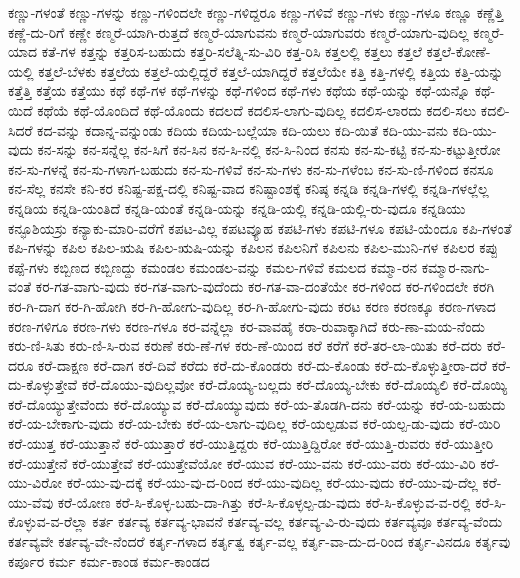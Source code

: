 {ಕಣ್ಣು-ಗಳಂತೆ
ಕಣ್ಣು-ಗಳನ್ನು
ಕಣ್ಣು-ಗಳಿಂದಲೇ
ಕಣ್ಣು-ಗಳಿದ್ದರೂ
ಕಣ್ಣು-ಗಳಿವೆ
ಕಣ್ಣು-ಗಳು
ಕಣ್ಣು-ಗಳೂ
ಕಣ್ಣೂ
ಕಣ್ಣೆತ್ತಿ
ಕಣ್ಣೆ-ದು-ರಿಗೆ
ಕಣ್ಣೇ
ಕಣ್ಮರೆ-ಯಾಗಿ-ರುತ್ತದೆ
ಕಣ್ಮರೆ-ಯಾಗುವನು
ಕಣ್ಮರೆ-ಯಾಗುವರು
ಕಣ್ಮರೆ-ಯಾಗು-ವುದಿಲ್ಲ
ಕಣ್ಮರೆ-ಯಾದ
ಕತೆ-ಗಳ
ಕತ್ತನ್ನು
ಕತ್ತರಿಸ-ಬಹುದು
ಕತ್ತರಿ-ಸಲೆತ್ನಿ-ಸು-ವಿರಿ
ಕತ್ತ-ರಿಸಿ
ಕತ್ತಲಲ್ಲಿ
ಕತ್ತಲು
ಕತ್ತಲೆ
ಕತ್ತಲೆ-ಕೋಣೆ-ಯಲ್ಲಿ
ಕತ್ತಲೆ-ಬೆಳಕು
ಕತ್ತಲೆಯ
ಕತ್ತಲೆ-ಯಲ್ಲಿದ್ದರೆ
ಕತ್ತಲೆ-ಯಾಗಿದ್ದರೆ
ಕತ್ತಲೆಯೇ
ಕತ್ತಿ
ಕತ್ತಿ-ಗಳಲ್ಲಿ
ಕತ್ತಿಯ
ಕತ್ತಿ-ಯನ್ನು
ಕತ್ತೆತ್ತಿ
ಕತ್ತೆಯ
ಕತ್ತೆಯು
ಕಥೆ
ಕಥೆ-ಗಳ
ಕಥೆ-ಗಳನ್ನು
ಕಥೆ-ಗಳಿಂದ
ಕಥೆ-ಗಳು
ಕಥೆಯ
ಕಥೆ-ಯನ್ನು
ಕಥೆ-ಯನ್ನೊ
ಕಥೆ-ಯಿದೆ
ಕಥೆಯೆ
ಕಥೆ-ಯೊಂದಿದೆ
ಕಥೆ-ಯೊಂದು
ಕದಲದೆ
ಕದಲಿಸ-ಲಾಗು-ವುದಿಲ್ಲ
ಕದಲಿಸ-ಲಾರದು
ಕದಲಿ-ಸಲು
ಕದಲಿ-ಸಿದರೆ
ಕದ-ವನ್ನು
ಕದಾನ್ನ-ವನ್ನುಂಡು
ಕದಿಯ
ಕದಿಯ-ಬಲ್ಲೆಯಾ
ಕದಿ-ಯಲು
ಕದಿ-ಯಿತೆ
ಕದಿ-ಯು-ವನು
ಕದಿ-ಯು-ವುದು
ಕನ-ಸನ್ನು
ಕನ-ಸನ್ನೆಲ್ಲ
ಕನ-ಸಿಗೆ
ಕನ-ಸಿನ
ಕನ-ಸಿ-ನಲ್ಲಿ
ಕನ-ಸಿ-ನಿಂದ
ಕನಸು
ಕನ-ಸು-ಕಟ್ಟಿ
ಕನ-ಸು-ಕಟ್ಟುತ್ತೀರೋ
ಕನ-ಸು-ಗಳನ್ನೆ
ಕನ-ಸು-ಗಳಾಗ-ಬಹುದು
ಕನ-ಸು-ಗಳಿವೆ
ಕನ-ಸು-ಗಳು
ಕನ-ಸು-ಗಳೆಂಬ
ಕನ-ಸು-ಣಿ-ಗಳಿಂದ
ಕನಸೂ
ಕನ-ಸೆಲ್ಲ
ಕನಸೇ
ಕನಿ-ಕರ
ಕನಿಷ್ಟ-ಪಕ್ಷ-ದಲ್ಲಿ
ಕನಿಷ್ಟ-ವಾದ
ಕನಿಷ್ಟಾಂಶಕ್ಕೆ
ಕನಿಷ್ಠ
ಕನ್ನಡಿ
ಕನ್ನಡಿ-ಗಳಲ್ಲಿ
ಕನ್ನಡಿ-ಗಳಲ್ಲೆಲ್ಲ
ಕನ್ನಡಿಯ
ಕನ್ನಡಿ-ಯಂತಿದೆ
ಕನ್ನಡಿ-ಯಂತೆ
ಕನ್ನಡಿ-ಯನ್ನು
ಕನ್ನಡಿ-ಯಲ್ಲಿ
ಕನ್ನಡಿ-ಯಲ್ಲಿ-ರು-ವುದೂ
ಕನ್ನಡಿಯು
ಕನ್ಫೂಶಿಯಸ್ರು
ಕನ್ಯಾಕು-ಮಾರಿ-ವರೆಗೆ
ಕಪಟ-ವಿಲ್ಲ
ಕಪಟವ್ಯೂಹ
ಕಪಟಿ-ಗಳು
ಕಪಟಿ-ಗಳೂ
ಕಪಟಿ-ಯೆಂದೂ
ಕಪಿ-ಗಳಂತೆ
ಕಪಿ-ಗಳನ್ನು
ಕಪಿಲ
ಕಪಿಲ-ಋಷಿ
ಕಪಿಲ-ಋಷಿ-ಯನ್ನು
ಕಪಿಲನ
ಕಪಿಲನಿಗೆ
ಕಪಿಲನು
ಕಪಿಲ-ಮುನಿ-ಗಳ
ಕಪಿಲರ
ಕಪ್ಪು
ಕಪ್ಪೆ-ಗಳು
ಕಬ್ಬಿಣದ
ಕಬ್ಬಿಣದ್ದು
ಕಮಂಡಲ
ಕಮಂಡಲ-ವನ್ನು
ಕಮಲ-ಗಳಿವೆ
ಕಮಲದ
ಕಮ್ಮಾ-ರನ
ಕಮ್ಮಾರ-ನಾಗು-ವಂತೆ
ಕರ-ಗತ-ವಾಗು-ವುದು
ಕರ-ಗತ-ವಾಗು-ವುದೆಂದು
ಕರ-ಗತ-ವಾ-ದಂತೆಯೇ
ಕರ-ಗಳಿಂದ
ಕರ-ಗಳಿಂದಲೇ
ಕರಗಿ
ಕರ-ಗಿ-ದಾಗ
ಕರ-ಗಿ-ಹೋಗಿ
ಕರ-ಗಿ-ಹೋಗು-ವುದಿಲ್ಲ
ಕರ-ಗಿ-ಹೋಗು-ವುದು
ಕರಟ
ಕರಣ
ಕರಣಕ್ಕೂ
ಕರಣ-ಗಳಾದ
ಕರಣ-ಗಳಿಗೂ
ಕರಣ-ಗಳು
ಕರಣ-ಗಳೂ
ಕರ-ವನ್ನೆಲ್ಲಾ
ಕರ-ವಾವಹೈ
ಕರಾ-ರುವಾಕ್ಕಾಗಿದೆ
ಕರು-ಣಾ-ಮಯ-ನೆಂದು
ಕರು-ಣಿ-ಸಿತು
ಕರು-ಣಿ-ಸಿ-ರುವ
ಕರುಣೆ
ಕರು-ಣೆ-ಗಳ
ಕರು-ಣೆ-ಯಿಂದ
ಕರೆ
ಕರೆಗೆ
ಕರೆ-ತರ-ಲಾ-ಯಿತು
ಕರೆ-ದರು
ಕರೆ-ದರೂ
ಕರೆ-ದಾಕ್ಷಣ
ಕರೆ-ದಾಗ
ಕರೆ-ದಿವೆ
ಕರೆದು
ಕರೆ-ದು-ಕೊಂಡರು
ಕರೆ-ದು-ಕೊಂಡು
ಕರೆ-ದು-ಕೊಳ್ಳುತ್ತೀರಾ-ದರೆ
ಕರೆ-ದು-ಕೊಳ್ಳುತ್ತೇವೆ
ಕರೆ-ದೊಯು-ವುದಿಲ್ಲವೋ
ಕರೆ-ದೊಯ್ಯ-ಬಲ್ಲದು
ಕರೆ-ದೊಯ್ಯ-ಬೇಕು
ಕರೆ-ದೊಯ್ಯಲಿ
ಕರೆ-ದೊಯ್ಯಿ
ಕರೆ-ದೊಯ್ಯುತ್ತೇವೆಂದು
ಕರೆ-ದೊಯ್ಯುವ
ಕರೆ-ದೊಯ್ಯುವುದು
ಕರೆ-ಯ-ತೊಡಗಿ-ದನು
ಕರೆ-ಯನ್ನು
ಕರೆ-ಯ-ಬಹುದು
ಕರೆ-ಯ-ಬೇಕಾಗು-ವುದು
ಕರೆ-ಯ-ಬೇಕು
ಕರೆ-ಯ-ಲಾಗು-ವುದಿಲ್ಲ
ಕರೆ-ಯಲ್ಪಡುವ
ಕರೆ-ಯಲ್ಪ-ಡು-ವುದು
ಕರೆ-ಯಿರಿ
ಕರೆ-ಯುತ್ತ
ಕರೆ-ಯುತ್ತಾನೆ
ಕರೆ-ಯುತ್ತಾರೆ
ಕರೆ-ಯುತ್ತಿದ್ದರು
ಕರೆ-ಯುತ್ತಿದ್ದಿರೋ
ಕರೆ-ಯುತ್ತಿ-ರುವರು
ಕರೆ-ಯುತ್ತೀರಿ
ಕರೆ-ಯುತ್ತೇನೆ
ಕರೆ-ಯುತ್ತೇವೆ
ಕರೆ-ಯುತ್ತೇವೆಯೋ
ಕರೆ-ಯುವ
ಕರೆ-ಯು-ವನು
ಕರೆ-ಯು-ವರು
ಕರೆ-ಯು-ವಿರಿ
ಕರೆ-ಯು-ವಿರೋ
ಕರೆ-ಯು-ವು-ದಕ್ಕೆ
ಕರೆ-ಯು-ವು-ದ-ರಿಂದ
ಕರೆ-ಯು-ವುದಿಲ್ಲ
ಕರೆ-ಯು-ವುದು
ಕರೆ-ಯು-ವು-ದೆಲ್ಲ
ಕರೆ-ಯು-ವೆವು
ಕರೆ-ಯೋಣ
ಕರೆ-ಸಿ-ಕೊಳ್ಳ-ಬಹು-ದಾ-ಗಿತ್ತು
ಕರೆ-ಸಿ-ಕೊಳ್ಳಲ್ಪ-ಡು-ವುದು
ಕರೆ-ಸಿ-ಕೊಳ್ಳುವ-ವ-ರಲ್ಲಿ
ಕರೆ-ಸಿ-ಕೊಳ್ಳುವ-ವ-ರೆಲ್ಲಾ
ಕರ್ತ
ಕರ್ತವ್ಯ
ಕರ್ತವ್ಯ-ಭಾವನೆ
ಕರ್ತವ್ಯ-ವಲ್ಲ
ಕರ್ತವ್ಯ-ವಿ-ರು-ವುದು
ಕರ್ತವ್ಯವೂ
ಕರ್ತವ್ಯ-ವೆಂದು
ಕರ್ತವ್ಯವೇ
ಕರ್ತವ್ಯ-ವೇ-ನೆಂದರೆ
ಕರ್ತೃ-ಗಳಾದ
ಕರ್ತೃತ್ವ
ಕರ್ತೃ-ವಲ್ಲ
ಕರ್ತೃ-ವಾ-ದು-ದ-ರಿಂದ
ಕರ್ತೃ-ವಿನದೂ
ಕರ್ತೃವು
ಕರ್ಪೂರ
ಕರ್ಮ
ಕರ್ಮ-ಕಾಂಡ
ಕರ್ಮ-ಕಾಂಡದ
}
